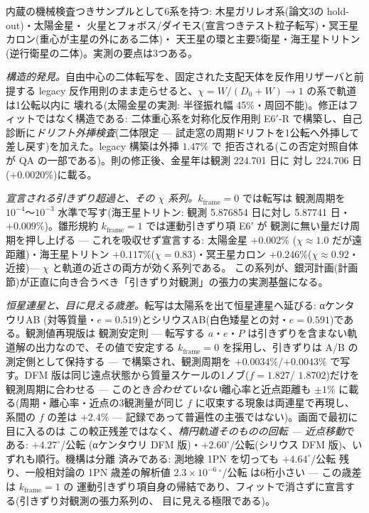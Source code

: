 \documentclass[a4paper,10pt,twocolumn]{ltjsarticle}
\begin{document}
内蔵の機械検査つきサンプルとして6系を持つ: 木星ガリレオ系(論文3の hold-out)・太陽金星・
火星とフォボス/ダイモス(宣言つきテスト粒子転写)・冥王星カロン(重心が主星の外にある二体)・
天王星の環と主要5衛星・海王星トリトン(逆行衛星の二体)。実測の要点は3つある。

\emph{構造的発見。}自由中心の二体転写を、固定された支配天体を反作用リザーバと前提する
legacy 反作用則のまま走らせると、$\chi=W/(D_0+W)\rightarrow 1$ の系で軌道は1公転以内に
壊れる(太陽金星の実測: 半径振れ幅 45\%・周回不能)。修正はフィットではなく構造である:
二体重心系を対称化反作用則 E6$'$-R で構築し、自己診断に\emph{ドリフト外挿検査}(二体限定 —
試走窓の周期ドリフトを1公転へ外挿して差し戻す)を加えた。legacy 構築は外挿 $1.47\%$ で
拒否される(この否定対照自体が QA の一部である)。則の修正後、金星年は観測 224.701 日に
対し 224.706 日($+0.0020\%$)に載る。

\emph{宣言される引きずり超過と、その $\chi$ 系列。}$k_{\mathrm{frame}}=0$ では転写は
観測周期を $10^{-4}$〜$10^{-3}$ 水準で写す(海王星トリトン: 観測 5.876854 日に対し
5.87741 日・$+0.009\%$)。雛形規約 $k_{\mathrm{frame}}=1$ では運動引きずり項 E6$'$ が
観測に無い量だけ周期を押し上げる — これを吸収せず宣言する: 太陽金星 $+0.002\%$
($\chi\approx1.0$ だが遠距離)・海王星トリトン $+0.117\%$($\chi=0.83$)・冥王星カロン
$+0.246\%$($\chi\approx0.92$・近接)— $\chi$ と軌道の近さの両方が効く系列である。
この系列が、銀河計画(計画節)が正直に向き合うべき「引きずり対観測」の張力の実測基盤になる。

\emph{恒星連星と、目に見える歳差。}転写は太陽系を出て恒星連星へ延びる: αケンタウリAB
(対等質量・$e=0.519$)とシリウスAB(白色矮星との対・$e=0.591$)である。観測値再現版は
観測安定則 — 転写する $a$・$e$・$P$ は引きずりを含まない軌道解の出力なので、その値で安定する
$k_{\mathrm{frame}}=0$ を採用し、引きずりは A/B の測定側として保持する — で構築され、観測周期を
$+0.0034\%$/$+0.0043\%$ で写す。DFM 版は同じ遠点状態から質量スケールの1ノブ($f=1.827$/
$1.8702$)だけを観測周期に合わせる — このとき\emph{合わせていない}離心率と近点距離も
$\pm1\%$ に載る(周期・離心率・近点の3観測量が同じ $f$ に収束する現象は両連星で再現し、
系間の $f$ の差は $+2.4\%$ — 記録であって普遍性の主張ではない)。画面で最初に目に入るのは
この較正残差ではなく、\emph{楕円軌道そのものの回転 — 近点移動}である: $+4.27^{\circ}$/公転
(αケンタウリ DFM 版)・$+2.60^{\circ}$/公転(シリウス DFM 版)、いずれも順行。機構は分離
済みである: 測地線 1PN を切っても $+4.64^{\circ}$/公転 残り、一般相対論の 1PN 歳差の解析値
$2.3\times10^{-6}\,{}^{\circ}$/公転 は6桁小さい — この歳差は $k_{\mathrm{frame}}=1$ の
運動引きずり項自身の帰結であり、フィットで消さずに宣言する(引きずり対観測の張力系列の、
目に見える極限である)。
\end{document}
